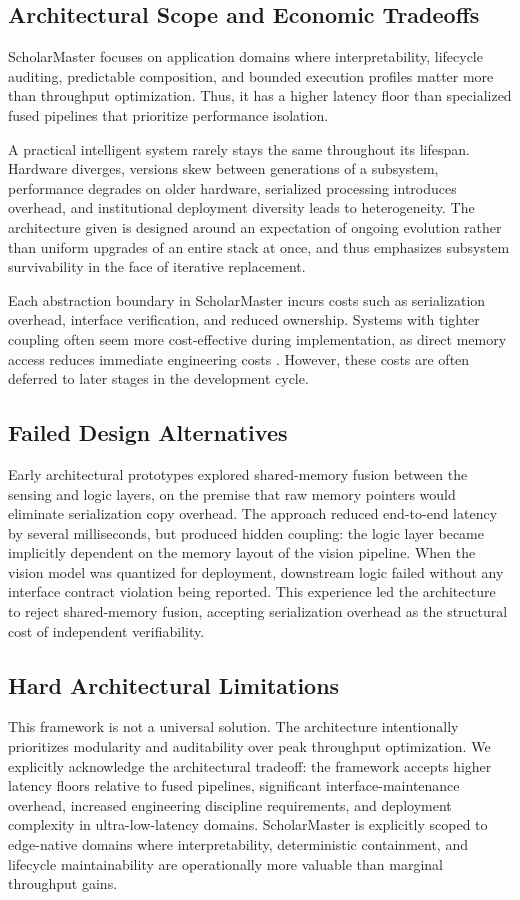 \documentclass[conference]{IEEEtran}
\begin{document}
\subsection{Architectural Scope and Economic Tradeoffs}
ScholarMaster focuses on application domains where interpretability, lifecycle auditing, predictable composition, and bounded execution profiles matter more than throughput optimization. Thus, it has a higher latency floor than specialized fused pipelines that prioritize performance isolation.

A practical intelligent system rarely stays the same throughout its lifespan. Hardware diverges, versions skew between generations of a subsystem, performance degrades on older hardware, serialized processing introduces overhead, and institutional deployment diversity leads to heterogeneity. The architecture given is designed around an expectation of ongoing evolution rather than uniform upgrades of an entire stack at once, and thus emphasizes subsystem survivability in the face of iterative replacement.

Each abstraction boundary in ScholarMaster incurs costs such as serialization overhead, interface verification, and reduced ownership. Systems with tighter coupling often seem more cost-effective during implementation, as direct memory access reduces immediate engineering costs \cite{b17}. However, these costs are often deferred to later stages in the development cycle.

\subsection{Failed Design Alternatives}
Early architectural prototypes explored shared-memory fusion between the sensing and logic layers, on the premise that raw memory pointers would eliminate serialization copy overhead. The approach reduced end-to-end latency by several milliseconds, but produced hidden coupling: the logic layer became implicitly dependent on the memory layout of the vision pipeline. When the vision model was quantized for deployment, downstream logic failed without any interface contract violation being reported. This experience led the architecture to reject shared-memory fusion, accepting serialization overhead as the structural cost of independent verifiability.

\subsection{Hard Architectural Limitations}
This framework is not a universal solution. The architecture intentionally prioritizes modularity and auditability over peak throughput optimization. We explicitly acknowledge the architectural tradeoff: the framework accepts higher latency floors relative to fused pipelines, significant interface-maintenance overhead, increased engineering discipline requirements, and deployment complexity in ultra-low-latency domains. ScholarMaster is explicitly scoped to edge-native domains where interpretability, deterministic containment, and lifecycle maintainability are operationally more valuable than marginal throughput gains.
\end{document}
